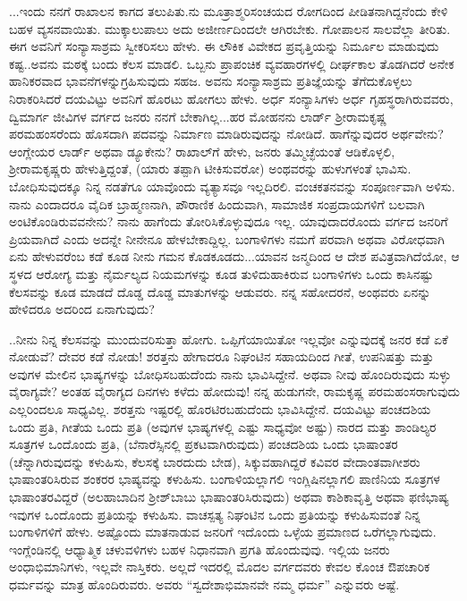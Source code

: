 ...ಇಂದು ನನಗೆ ರಾಖಾಲನ ಕಾಗದ ತಲುಪಿತು.\enginline{-}ನು ಮೂತ್ರಾಶ್ಮರಿಸಂಚಯದ ರೋಗದಿಂದ ಪೀಡಿತನಾಗಿದ್ದನೆಂದು ಕೇಳಿ ಬಹಳ ವ್ಯಸನವಾಯಿತು. ಮುಕ್ಕಾಲುಪಾಲು ಅದು ಅಜೀರ್ಣದಿಂದಲೇ ಆಗಿರಬೇಕು. ಗೋಪಾಲನ ಸಾಲವೆಲ್ಲಾ ತೀರಿತು. ಈಗ ಅವನಿಗೆ ಸಂನ್ಯಾಸಾಶ್ರಮ ಸ್ವೀಕರಿಸಲು ಹೇಳು. ಈ ಲೌಕಿಕ ವಿವೇಕದ ಪ್ರವೃತ್ತಿಯನ್ನು ನಿರ್ಮೂಲ ಮಾಡುವುದು ಕಷ್ಟ..ಅವನು ಮಠಕ್ಕೆ ಬಂದು ಕೆಲಸ ಮಾಡಲಿ. ಒಬ್ಬನು ಪ್ರಾಪಂಚಿಕ ವ್ಯವಹಾರಗಳಲ್ಲಿ ದೀರ್ಘಕಾಲ ತೊಡಗಿದರೆ ಅನೇಕ ಹಾನಿಕರವಾದ ಭಾವನೆಗಳನ್ನು\break ಗ್ರಹಿಸುವುದು ಸಹಜ. ಅವನು ಸಂನ್ಯಾಸಾಶ್ರಮ ಪ್ರತಿಜ್ಞೆಯನ್ನು ತೆಗೆದುಕೊಳ್ಳಲು ನಿರಾಕರಿಸಿದರೆ ದಯವಿಟ್ಟು ಅವನಿಗೆ ಹೊರಟು ಹೋಗಲು ಹೇಳು. ಅರ್ಧ ಸಂನ್ಯಾಸಿಗಳು ಅರ್ಧ ಗೃಹಸ್ಥರಾಗಿರುವವರು, ದ್ವಿಮಾರ್ಗ ಜೀವಿಗಳ ವರ್ಗದ ಜನರು ನನಗೆ ಬೇಕಾಗಿಲ್ಲ...ಹರ ಮೋಹನನು ಲಾರ್ಡ್ ಶ‍್ರೀರಾಮಕೃಷ್ಣ ಪರಮಹಂಸರೆಂದು ಹೊಸದಾಗಿ ಪದವನ್ನು ನಿರ್ಮಾಣ ಮಾಡಿರುವುದನ್ನು ನೋಡಿದೆ. ಹಾಗೆನ್ನುವುದರ ಅರ್ಥವೇನು?ಆಂಗ್ಲೇಯರ ಲಾರ್ಡ್ ಅಥವಾ ಡ್ಯೂಕೇನು? ರಾಖಾಲ್‌ಗೆ ಹೇಳು, ಜನರು ತಮ್ಮಿಚ್ಛೆಯಂತೆ ಆಡಿಕೊಳ್ಳಲಿ, ಶ‍್ರೀರಾಮಕೃಷ್ಣರು ಹೇಳುತ್ತಿದ್ದಂತೆ, (ಯಾರು ತಪ್ಪಾಗಿ ಟೀಕಿಸುವರೋ) ಅಂಥವರನ್ನು ಹುಳುಗಳಂತೆ ಭಾವಿಸು. ಬೋಧಿಸುವುದಕ್ಕೂ ನಿನ್ನ ನಡತೆಗೂ ಯಾವೊಂದು ವ್ಯತ್ಯಾಸವೂ ಇಲ್ಲದಿರಲಿ. ವಂಚಕತನವನ್ನು ಸಂಪೂರ್ಣವಾಗಿ ಅಳಿಸು. ನಾನು ಎಂದಾದರೂ ವೈದಿಕ ಬ್ರಾಹ್ಮಣನಾಗಿ, ಪೌರಾಣಿಕ ಹಿಂದುವಾಗಿ, ಸಾಮಾಜಿಕ ಸಂಪ್ರದಾಯಗಳಿಗೆ ಬಲವಾಗಿ ಅಂಟಿಕೊಂಡಿರುವವನೇನು? ನಾನು ಹಾಗೆಂದು ತೋರಿಸಿಕೊಳ್ಳುವುದೂ ಇಲ್ಲ. ಯಾವುದಾದರೊಂದು ವರ್ಗದ ಜನರಿಗೆ ಪ್ರಿಯವಾಗಿದೆ ಎಂದು ಅದನ್ನೇ ನೀನೇನೂ ಹೇಳಬೇಕಾದ್ದಿಲ್ಲ. ಬಂಗಾಳಿಗಳು ನಮಗೆ ಪರವಾಗಿ ಅಥವಾ ವಿರೋಧವಾಗಿ ಏನು ಹೇಳುವರೆಂಬ ಕಡೆ ಕೂಡ ನೀನು ಗಮನ ಕೊಡಕೂಡದು...ಯಾವನ ಜನ್ಮದಿಂದ ಆ ದೇಶ ಪವಿತ್ರವಾಗಿದೆಯೋ, ಆ ಸ್ಥಳದ ಆರೋಗ್ಯ ಮತ್ತು ನೈರ್ಮಲ್ಯದ ನಿಯಮಗಳನ್ನು ಕೂಡ ತುಳಿದುಹಾಕಿರುವ ಬಂಗಾಳಿಗಳು ಒಂದು ಕಾಸಿನಷ್ಟು ಕೆಲಸವನ್ನು ಕೂಡ ಮಾಡದೆ ದೊಡ್ಡ ದೊಡ್ಡ ಮಾತುಗಳನ್ನು ಆಡುವರು. ನನ್ನ ಸಹೋದರನೆ, ಅಂಥವರು ಏನನ್ನು ಹೇಳಿದರೂ ಅದರಿಂದ ಏನಾಗುವುದು?

..ನೀನು ನಿನ್ನ ಕೆಲಸವನ್ನು ಮುಂದುವರಿಸುತ್ತಾ ಹೋಗು. ಒಪ್ಪಿಗೆಯಾಯಿತೋ ಇಲ್ಲವೋ ಎನ್ನುವುದಕ್ಕೆ ಜನರ ಕಡೆ ಏಕೆ ನೋಡುವೆ? ದೇವರ ಕಡೆ ನೋಡು! ಶರತ್ತನು ಹೇಗಾದರೂ ನಿಘಂಟಿನ ಸಹಾಯದಿಂದ ಗೀತೆ, ಉಪನಿಷತ್ತು ಮತ್ತು ಅವುಗಳ ಮೇಲಿನ ಭಾಷ್ಯಗಳನ್ನು ಬೋಧಿಸಬಹುದೆಂದು ನಾನು ಭಾವಿಸಿದ್ದೇನೆ. ಅಥವಾ ನೀವು ಹೊಂದಿರುವುದು ಸುಳ್ಳು ವೈರಾಗ್ಯವೇ? ಅಂತಹ ವೈರಾಗ್ಯದ ದಿನಗಳು ಕಳೆದು ಹೋದುವು! ನನ್ನ ಹುಡುಗನೇ, ರಾಮಕೃಷ್ಣ ಪರಮಹಂಸರಾಗುವುದು ಎಲ್ಲರಿಂದಲೂ ಸಾಧ್ಯವಿಲ್ಲ. ಶರತ್ತನು ಇಷ್ಟರಲ್ಲಿ ಹೊರಟಿರಬಹುದೆಂದು ಭಾವಿಸಿದ್ದೇನೆ. ದಯವಿಟ್ಟು ಪಂಚದಶಿಯ ಒಂದು ಪ್ರತಿ, ಗೀತೆಯ ಒಂದು ಪ್ರತಿ (ಅವುಗಳ ಭಾಷ್ಯಗಳಲ್ಲಿ ಎಷ್ಟು ಸಾಧ್ಯವೋ ಅಷ್ಟು) ನಾರದ ಮತ್ತು ಶಾಂಡಿಲ್ಯರ ಸೂತ್ರಗಳ ಒಂದೊಂದು ಪ್ರತಿ, (ಬೆನಾರೆಸ್ಸಿನಲ್ಲಿ ಪ್ರಕಟವಾಗಿರುವುದು) ಪಂಚದಶಿಯ ಒಂದು ಭಾಷಾಂತರ (ಚೆನ್ನಾಗಿರುವುದನ್ನು ಕಳುಹಿಸು, ಕೆಲಸಕ್ಕೆ ಬಾರದುದು ಬೇಡ), ಸಿಕ್ಕುವಹಾಗಿದ್ದರೆ ಕವಿವರ ವೇದಾಂತವಾಗೀಶರು ಭಾಷಾಂತರಿಸಿರುವ ಶಂಕರರ ಭಾಷ್ಯವನ್ನು ಕಳುಹಿಸು. ಬಂಗಾಳಿಯಲ್ಲಾಗಲಿ ಇಂಗ್ಲಿಷಿನಲ್ಲಾಗಲಿ ಪಾಣಿನಿಯ ಸೂತ್ರಗಳ ಭಾಷಾಂತರವಿದ್ದರೆ (ಅಲಹಾಬಾದಿನ ಶ‍್ರೀಶ್‌ಬಾಬು ಭಾಷಾಂತರಿಸಿರುವುದು) ಅಥವಾ ಕಾಶಿಕಾವೃತ್ತಿ ಅಥವಾ ಫಣಿಭಾಷ್ಯ ಇವುಗಳ ಒಂದೊಂದು ಪ್ರತಿಯನ್ನು ಕಳುಹಿಸು. ವಾಚಸ್ಪತ್ಯ ನಿಘಂಟಿನ ಒಂದು ಪ್ರತಿಯನ್ನು ಕಳುಹಿಸುವಂತೆ ನಿನ್ನ ಬಂಗಾಳಿಗಳಿಗೆ ಹೇಳು. ಅಷ್ಟೊಂದು ಮಾತನಾಡುವ ಜನರಿಗೆ ಇದೊಂದು ಒಳ್ಳೆಯ ಪ್ರಮಾಣದ ಒರೆಗಲ್ಲಾಗುವುದು. ಇಂಗ್ಲೆಂಡಿನಲ್ಲಿ ಆಧ್ಯಾತ್ಮಿಕ ಚಳುವಳಿಗಳು ಬಹಳ ನಿಧಾನವಾಗಿ ಪ್ರಗತಿ ಹೊಂದುವುವು. ಇಲ್ಲಿಯ ಜನರು ಅಂಧಾಭಿಮಾನಿಗಳು, ಇಲ್ಲವೇ ನಾಸ್ತಿಕರು. ಅಲ್ಲದೆ ಇದರಲ್ಲಿ ಮೊದಲ ವರ್ಗದವರು ಕೇವಲ ಕೊಂಚ ಔಪಚಾರಿಕ ಧರ್ಮವನ್ನು ಮಾತ್ರ ಹೊಂದಿರುವರು. ಅವರು “ಸ್ವದೇಶಾಭಿಮಾನವೇ ನಮ್ಮ ಧರ್ಮ” ಎನ್ನುವರು ಅಷ್ಟೆ.


